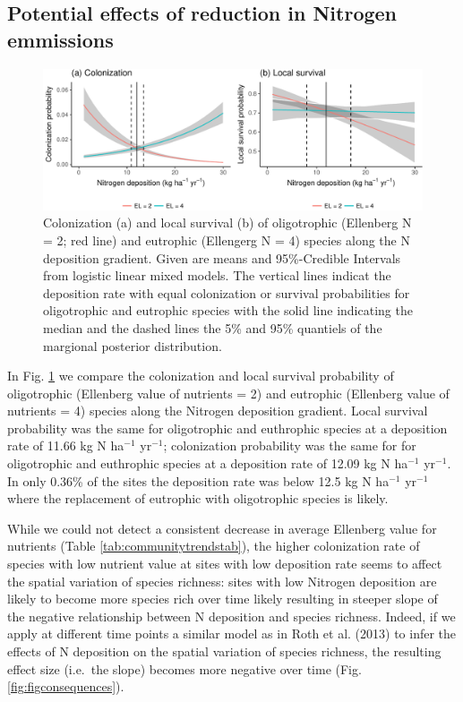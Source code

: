 \documentclass[fleqn,10pt,lineno]{wlpeerj} %
\theoremstyle{definition}
\theoremstyle{definition}
\theoremstyle{definition}
\theoremstyle{remark}
\begin{document}
\subsection*{Potential effects of reduction in Nitrogen
emmissions}\label{potential-effects-of-reduction-in-nitrogen-emmissions}

\begin{figure}
\includegraphics[width=1\linewidth]{Manuscript_files/figure-latex/cl-1} \caption{Colonization (a) and local survival (b) of oligotrophic (Ellenberg N = 2; red line) and eutrophic (Ellengerg N = 4) species along the N deposition gradient. Given are means and 95\%-Credible Intervals from logistic linear mixed models. The vertical lines indicat the deposition rate with equal colonization or survival probabilities for oligotrophic and eutrophic species with the solid line indicating the median and the dashed lines the 5\% and 95\% quantiels of the margional posterior distribution.}\label{fig:cl}
\end{figure}

In Fig. \ref{fig:cl} we compare the colonization and local survival
probability of oligotrophic (Ellenberg value of nutrients = 2) and
eutrophic (Ellenberg value of nutrients = 4) species along the Nitrogen
deposition gradient. Local survival probability was the same for
oligotrophic and euthrophic species at a deposition rate of 11.66 kg N
ha\(^{-1}\) yr\(^{-1}\); colonization probability was the same for for
oligotrophic and euthrophic species at a deposition rate of 12.09 kg N
ha\(^{-1}\) yr\(^{-1}\). In only 0.36\% of the sites the deposition rate
was below 12.5 kg N ha\(^{-1}\) yr\(^{-1}\) where the replacement of
eutrophic with oligotrophic species is likely.

While we could not detect a consistent decrease in average Ellenberg
value for nutrients (Table \ref{tab:communitytrendstab}), the higher
colonization rate of species with low nutrient value at sites with low
deposition rate seems to affect the spatial variation of species
richness: sites with low Nitrogen deposition are likely to become more
species rich over time likely resulting in steeper slope of the negative
relationship between N deposition and species richness. Indeed, if we
apply at different time points a similar model as in Roth et al. (2013)
to infer the effects of N deposition on the spatial variation of species
richness, the resulting effect size (i.e.~the slope) becomes more
negative over time (Fig. \ref{fig:figconsequences}).
\end{document}
